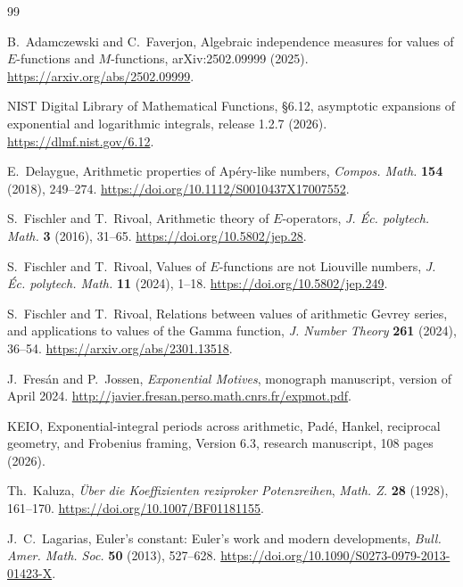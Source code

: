 \documentclass[11pt]{article}
\theoremstyle{keio}
\theoremstyle{definition}
\theoremstyle{remark}
\begin{document}
\clearpage
\begin{thebibliography}{99}
\small
\raggedright

B.~Adamczewski and C.~Faverjon,
\newblock Algebraic independence measures for values of \(E\)-functions and
\(M\)-functions,
\newblock arXiv:2502.09999 (2025).
\newblock \url{https://arxiv.org/abs/2502.09999}.

NIST Digital Library of Mathematical Functions,
\newblock \S6.12, asymptotic expansions of exponential and logarithmic
integrals,
\newblock release 1.2.7 (2026).
\newblock \url{https://dlmf.nist.gov/6.12}.

E.~Delaygue,
\newblock Arithmetic properties of Ap\'ery-like numbers,
\newblock \emph{Compos. Math.} \textbf{154} (2018), 249--274.
\newblock \url{https://doi.org/10.1112/S0010437X17007552}.

S.~Fischler and T.~Rivoal,
\newblock Arithmetic theory of \(E\)-operators,
\newblock \emph{J. \'Ec. polytech. Math.} \textbf{3} (2016), 31--65.
\newblock \url{https://doi.org/10.5802/jep.28}.

S.~Fischler and T.~Rivoal,
\newblock Values of \(E\)-functions are not Liouville numbers,
\newblock \emph{J. \'Ec. polytech. Math.} \textbf{11} (2024), 1--18.
\newblock \url{https://doi.org/10.5802/jep.249}.

S.~Fischler and T.~Rivoal,
\newblock Relations between values of arithmetic Gevrey series, and
applications to values of the Gamma function,
\newblock \emph{J. Number Theory} \textbf{261} (2024), 36--54.
\newblock \url{https://arxiv.org/abs/2301.13518}.

J.~Fres\'an and P.~Jossen,
\newblock \emph{Exponential Motives},
\newblock monograph manuscript, version of April 2024.
\newblock \url{http://javier.fresan.perso.math.cnrs.fr/expmot.pdf}.

KEIO,
\newblock Exponential-integral periods across arithmetic, Pad\'e, Hankel,
reciprocal geometry, and Frobenius framing,
\newblock Version 6.3, research manuscript, 108 pages (2026).

Th.~Kaluza,
\newblock \emph{\"Uber die Koeffizienten reziproker Potenzreihen},
\newblock \emph{Math. Z.} \textbf{28} (1928), 161--170.
\newblock \url{https://doi.org/10.1007/BF01181155}.

J.~C.~Lagarias,
\newblock Euler's constant: Euler's work and modern developments,
\newblock \emph{Bull. Amer. Math. Soc.} \textbf{50} (2013), 527--628.
\newblock \url{https://doi.org/10.1090/S0273-0979-2013-01423-X}.


\end{thebibliography}
\end{document}

